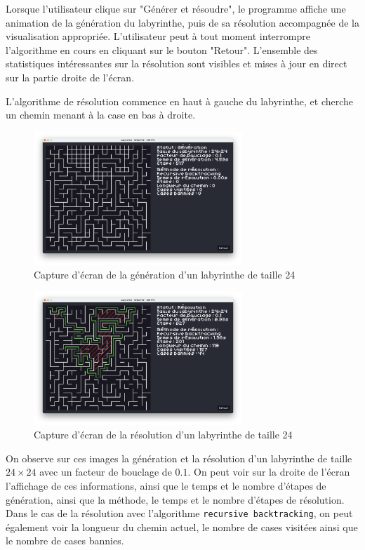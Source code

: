 \documentclass[12pt]{scrreprt} %
\begin{document}
Lorsque l'utilisateur clique sur "Générer et résoudre", le programme affiche une animation de la génération du labyrinthe, puis de sa résolution accompagnée de la visualisation appropriée. L'utilisateur peut à tout moment interrompre l'algorithme en cours en cliquant sur le bouton "Retour". L'ensemble des statistiques intéressantes sur la résolution sont visibles et mises à jour en direct sur la partie droite de l'écran.

L'algorithme de résolution commence en haut à gauche du labyrinthe, et cherche un chemin menant à la case en bas à droite.

\begin{figure}[h]
    \centering
    \includegraphics[width=0.70\textwidth]{images/labyrinthgeneratingsmall.png}
    \caption{Capture d'écran de la génération d'un labyrinthe de taille 24}
\end{figure}

\begin{figure}[h]
    \centering
    \includegraphics[width=0.70\textwidth]{images/recbacsolving24.png}
    \caption{Capture d'écran de la résolution d'un labyrinthe de taille 24}
\end{figure}


On observe sur ces images la génération et la résolution d'un labyrinthe de taille $24 \times 24$ avec un facteur de bouclage de $0.1$. On peut voir sur la droite de l'écran l'affichage de ces informations, ainsi que le temps et le nombre d'étapes de génération, ainsi que la méthode, le temps et le nombre d'étapes de résolution. Dans le cas de la résolution avec l'algorithme \texttt{recursive backtracking}, on peut également voir la longueur du chemin actuel, le nombre de cases visitées ainsi que le nombre de cases bannies.
\end{document}
